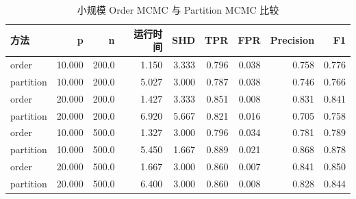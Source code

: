 \begin{table}[H]
\centering
\small
\setlength{\tabcolsep}{2pt}
\caption{小规模 Order MCMC 与 Partition MCMC 比较}
\label{tab:small}
\begin{tabular}{lrrrrrrrr}
\toprule
方法 & p & n & 运行时间 & SHD & TPR & FPR & Precision & F1
\\
\midrule
order & 10.000 & 200.0 & 1.150 & 3.333 & 0.796 & 0.038 & 0.758 & 0.776 \\
partition & 10.000 & 200.0 & 5.027 & 3.000 & 0.787 & 0.038 & 0.746 & 0.766 \\
order & 20.000 & 200.0 & 1.427 & 3.333 & 0.851 & 0.008 & 0.831 & 0.841 \\
partition & 20.000 & 200.0 & 6.920 & 5.667 & 0.821 & 0.016 & 0.705 & 0.758 \\
order & 10.000 & 500.0 & 1.327 & 3.000 & 0.796 & 0.034 & 0.781 & 0.789 \\
partition & 10.000 & 500.0 & 5.450 & 1.667 & 0.889 & 0.021 & 0.868 & 0.878 \\
order & 20.000 & 500.0 & 1.667 & 3.000 & 0.860 & 0.007 & 0.841 & 0.850 \\
partition & 20.000 & 500.0 & 6.400 & 3.000 & 0.860 & 0.008 & 0.828 & 0.844 \\
\bottomrule
\end{tabular}
\end{table}
